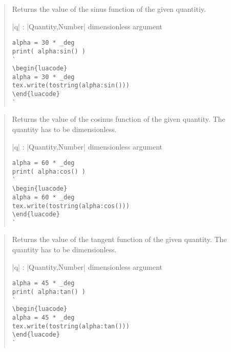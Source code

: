 \documentclass{ltxdoc}
\begin{document}
\begin{quote}
  Returns the value of the sinus function of the given quantitiy.

  \begin{description}
  \item |q| : |Quantity,Number| dimensionless argument
  \end{description}

\begin{lstlisting}
alpha = 30 * _deg
print( alpha:sin() )
`
\begin{luacode}
alpha = 30 * _deg
tex.write(tostring(alpha:sin()))
\end{luacode}
`
\end{lstlisting}

\end{quote}



\begin{quote}
  Returns the value of the cosinus function of the given quantity. The quantity has to be dimensionless.

  \begin{description}
  \item |q| : |Quantity,Number| dimensionless argument
  \end{description}

\begin{lstlisting}
alpha = 60 * _deg
print( alpha:cos() )
`
\begin{luacode}
alpha = 60 * _deg
tex.write(tostring(alpha:cos()))
\end{luacode}
`
\end{lstlisting}

\end{quote}



\begin{quote}
  Returns the value of the tangent function of the given quantity. The quantity has to be dimensionless.

  \begin{description}
  \item |q| : |Quantity,Number| dimensionless argument
  \end{description}

\begin{lstlisting}
alpha = 45 * _deg
print( alpha:tan() )
`
\begin{luacode}
alpha = 45 * _deg
tex.write(tostring(alpha:tan()))
\end{luacode}
`
\end{lstlisting}

\end{quote}
\end{document}

